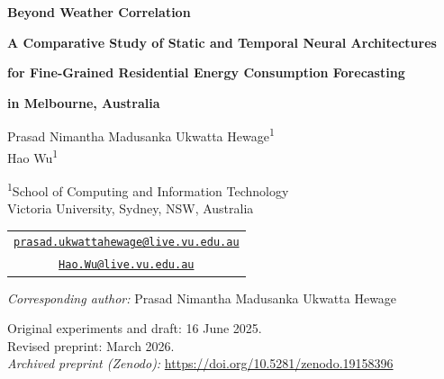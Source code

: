 \documentclass[12pt,a4paper]{article}
\begin{document}
\begin{titlepage}
  \thispagestyle{empty}
  \centering
  \vspace*{12mm}

  {\LARGE\bfseries Beyond Weather Correlation\par}
  \vspace{3mm}
  {\large\bfseries A Comparative Study of Static and Temporal Neural Architectures\par}
  \vspace{2mm}
  {\large\bfseries for Fine-Grained Residential Energy Consumption Forecasting\par}
  \vspace{2mm}
  {\large\bfseries in Melbourne, Australia\par}

  \vspace{18mm}

  {\large
  Prasad Nimantha Madusanka Ukwatta Hewage\textsuperscript{1}\\[0.6em]
  Hao Wu\textsuperscript{1}\par}

  \vspace{10mm}

  {\normalsize
  \textsuperscript{1}School of Computing and Information Technology\\
  Victoria University, Sydney, NSW, Australia\par}

  \vspace{12mm}

  {\small
  \begin{tabular}{c}
  \href{mailto:prasad.ukwattahewage@live.vu.edu.au}{\texttt{prasad.ukwattahewage@live.vu.edu.au}}\\[0.55em]
  \href{mailto:Hao.Wu@live.vu.edu.au}{\texttt{Hao.Wu@live.vu.edu.au}}
  \end{tabular}\par}

  \vspace{8mm}

  {\small\textit{Corresponding author:} Prasad Nimantha Madusanka Ukwatta Hewage\par}

  \vfill

  {\normalsize
  Original experiments and draft: 16 June 2025.\\[0.4em]
  Revised preprint: March 2026.\\[0.9em]
  \textit{Archived preprint (Zenodo):} \url{https://doi.org/10.5281/zenodo.19158396}\par}

  \vspace{16mm}
\end{titlepage}
\end{document}
